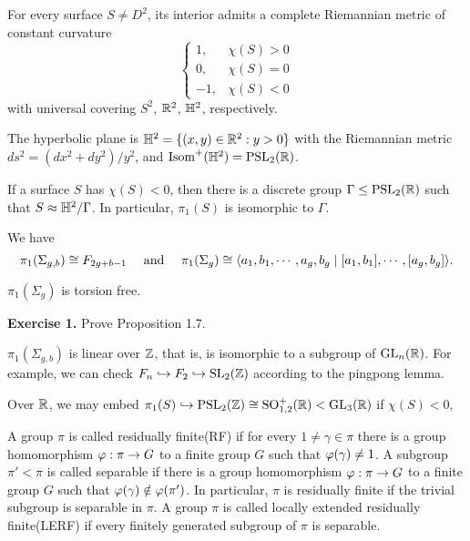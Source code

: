 \documentclass{../../small}
\begin{document}
\begin{thm}[Uniformization]
For every surface $S\ne D^2$, its interior admits a complete Riemannian metric of constant curvature
\[\begin{cases}1,&\chi(S)>0\\0,&\chi(S)=0\\-1,&\chi(S)<0\end{cases}\]
with universal covering $S^2$, $\mathbb{R}^2$, $\mathbb{H}^2$, respectively.
\end{thm}

The hyperbolic plane is $\mathbb{H}^2=\{(x,y)\in\mathbb{R}^2:y>0\}$ with the Riemannian metric $ds^2=(dx^2+dy^2)/y^2$, and $\operatorname{Isom}^+(\mathbb{H}^2)=\mathrm{PSL}_2(\mathbb{R})$.

\begin{prop}
If a surface $S$ has $\chi(S)<0$, then there is a discrete group $\Gamma\le\mathrm{PSL}_2(\mathbb{R})$ such that $S\approx\mathbb{H}^2/\Gamma$.
In particular, $\pi_1(S)$ is isomorphic to $\Gamma$.
\end{prop}
We have
\[\pi_1(\Sigma_{g,b})\cong F_{2g+b-1}\quad\text{ and }\quad\pi_1(\Sigma_g)\cong\langle a_1,b_1,\cdots,a_g,b_g\mid[a_1,b_1],\cdots,[a_g,b_g]\rangle.\]

\begin{prop}
$\pi_1(\Sigma_g)$ is torsion free.
\end{prop}

\textbf{Exercise 1.} Prove Proposition 1.7.


\begin{thm}[Newman]
$\pi_1(\Sigma_{g,b})$ is linear over $\mathbb{Z}$, that is, is isomorphic to a subgroup of $\mathrm{GL}_n(\mathbb{R})$.
For example, we can check $F_n\hookrightarrow F_2\hookrightarrow \mathrm{SL}_2(\mathbb{Z})$ according to the pingpong lemma.
\end{thm}


Over $\mathbb{R}$, we may embed $\pi_1(S)\hookrightarrow\mathrm{PSL}_2(\mathbb{Z})\cong\mathrm{SO}_{1,2}^+(\mathbb{R})<\mathrm{GL}_3(\mathbb{R})$ if $\chi(S)<0$,

\begin{defn*}
A group $\pi$ is called residually finite(RF) if for every $1\ne\gamma\in\pi$ there is a group homomorphism $\varphi:\pi\to G$ to a finite group $G$ such that $\varphi(\gamma)\ne1$.
A subgroup $\pi'<\pi$ is called separable if there is a group homomorphism $\varphi:\pi\to G$ to a finite group $G$ such that $\varphi(\gamma)\notin\varphi(\pi')$.
In particular, $\pi$ is residually finite if the trivial subgroup is separable in $\pi$.
A group $\pi$ is called locally extended residually finite(LERF) if every finitely generated subgroup of $\pi$ is separable.
\end{defn*}
\end{document}
